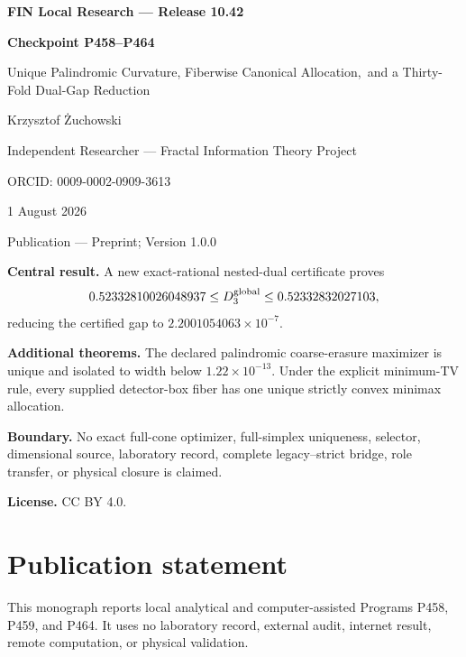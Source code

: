 \documentclass[11pt,a4paper,openany]{report}
\begin{document}
\hypersetup{pageanchor=false}
\begin{titlepage}\centering\vspace*{8mm}
{\Large\bfseries FIN Local Research --- Release 10.42\par}\vspace{10mm}
{\Huge\bfseries Checkpoint P458--P464\par}\vspace{6mm}
{\Large Unique Palindromic Curvature, Fiberwise Canonical Allocation,\
and a Thirty-Fold Dual-Gap Reduction\par}\vspace{14mm}
{\Large Krzysztof \.Zuchowski\par}\vspace{2mm}
{\normalsize Independent Researcher --- Fractal Information Theory Project\par}
{\normalsize ORCID: 0009-0002-0909-3613\par}\vspace{8mm}
{\large 1 August 2026\par}{\normalsize Publication --- Preprint; Version 1.0.0\par}
\vfill
\begin{minipage}{0.92\textwidth}\small
\textbf{Central result.} A new exact-rational nested-dual certificate proves
\[0.52332810026048937\le D_3^{\rm global}\le0.52332832027103,\]
reducing the certified gap to $2.2001054063\times10^{-7}$.

\medskip\textbf{Additional theorems.} The declared palindromic coarse-erasure
maximizer is unique and isolated to width below $1.22\times10^{-13}$. Under
the explicit minimum-TV rule, every supplied detector-box fiber has one unique
strictly convex minimax allocation.

\medskip\textbf{Boundary.} No exact full-cone optimizer, full-simplex
uniqueness, selector, dimensional source, laboratory record, complete
legacy--strict bridge, role transfer, or physical closure is claimed.

\medskip\textbf{License.} CC BY 4.0.
\end{minipage}\vfill\end{titlepage}
\hypersetup{pageanchor=true}
\chapter*{Publication statement}
This monograph reports local analytical and computer-assisted Programs P458,
P459, and P464. It uses no laboratory record, external audit, internet result,
remote computation, or physical validation.
\tableofcontents\clearpage{}
\end{document}
